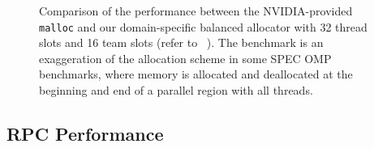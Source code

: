 \begin{figure}[hbt]
    \centering
    \resizebox{.9\linewidth}{!}{
       
    }
    \vspace{-3mm}
    \caption{
    Comparison of the performance between the NVIDIA-provided \lstinline{malloc} and our domain-specific balanced allocator with 32 thread slots and 16 team slots (refer to ~).
    The benchmark is an exaggeration of the allocation scheme in some SPEC OMP benchmarks, where memory is allocated and deallocated at the beginning and end of a parallel region with all threads.
    }
    \label{fig:malloc}
\vspace{-3mm}
\end{figure}

\subsection{RPC Performance}


